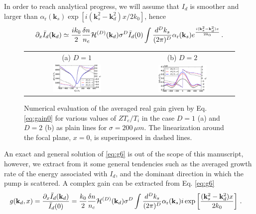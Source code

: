 \documentclass[
 reprint,
 amsmath,amssymb,
 aps,
]{revtex4-1}
\begin{document}
\begin{widetext}
In order to reach analytical progress, we will assume that $I_d$ is  smoother and larger  than $\alpha_\mathrm{r}(\mathbf{k}_s) 
\exp[i(\mathbf{k}_s^2-\mathbf{k}_d^2)x / 2k_0]$, hence 
\begin{align}
\partial_x\Bar{I}_d(\mathbf{k}_d)\simeq  \frac{ik_0}{2}  \frac{\delta n}{n_c}
 \mathcal{H}^{(D)}(\mathbf{k}_d) \sigma^D \Bar{I}_d(0) \int \frac{d^Dk_s}{(2\pi)^D}  \alpha_\mathrm{r}(\mathbf{k}_s) 
e^{\frac{i(\mathbf{k}_s^2-\mathbf{k}_d^2)x}{2k_0}} 
\, . \label{eq:g6}
\end{align}
 
 \begin{figure}
\begin{tabular}{cc}
(a) $D=1$ &(b) $D=2$ \\
\includegraphics[width=0.49\textwidth]{int_akin_sin.eps}
 &
\includegraphics[width=0.49\textwidth]{int_akin_sin_D2.eps}
\end{tabular}
\caption{ \label{fig:intakinsin}
Numerical evaluation of the averaged real gain given by Eq. \eqref{eq:gain0} for various values of $ZT_e/T_i$ in the case $D=1$ (a) and $D=2$ (b) as plain lines for $\sigma = 200 \,\mu m$. The linearization around the focal plane, $x=0$, is superimposed in dashed lines. 
 }
\end{figure}
An exact and general solution of \eqref{eq:g6} is out of the scope of this manuscript, however, we extract from it some general tendencies such as the averaged growth rate of the energy associated with $I_d$, and the dominant direction in which the pump is scattered. A complex gain can be extracted from  Eq. \eqref{eq:g6}
\begin{align}
&g(\mathbf{k}_d,x) = \frac{\partial_x\Bar{I}_d(\mathbf{k}_d)}{\Bar{I}_d(0)} %
=  \frac{k_0}{2}  \frac{\delta n}{n_c}
 \mathcal{H}^{(D)}(\mathbf{k}_d)  \sigma^D \int \frac{d^Dk_s}{(2\pi)^D}  \alpha_\mathrm{r}(\mathbf{k}_s) 
i\exp\left[ \frac{(\mathbf{k}_s^2-\mathbf{k}_d^2)x}{2k_0}\right]
\, . \label{eq:gainkd}
\end{align}
 \end{widetext}
\end{document}
